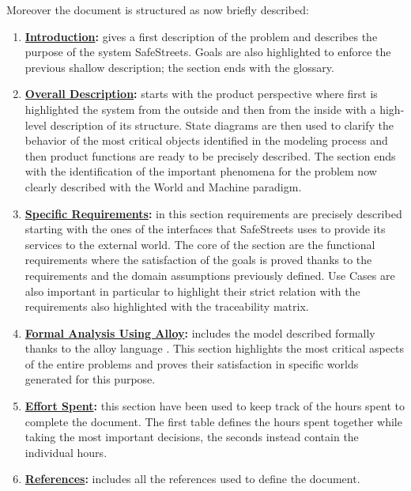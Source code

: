 	Moreover the document is structured as now briefly described:
	\begin{enumerate}
		\item \textbf{\hyperref[sec:introduction]{Introduction}:} gives a first description of the problem and describes the purpose of the system SafeStreets. Goals are also highlighted to enforce the previous shallow description; the section ends with the glossary.
		
		\item \textbf{\hyperref[sec:overallDescription]{Overall Description}:} starts with the product perspective where first is highlighted the system from the outside and then from the inside with a high-level description of its structure. State diagrams are then used to clarify the behavior of the most critical objects identified in the modeling process and then product functions are ready to be precisely described. The section ends with the identification of the important phenomena for the problem now clearly described with the World and Machine paradigm.
		
		\item \textbf{\hyperref[sec:specificRequirements]{Specific Requirements}:} in this section requirements are precisely described starting with the ones of the interfaces that SafeStreets uses to provide its services to the external world. The core of the section are the functional requirements where the satisfaction of the goals is proved thanks to the requirements and the domain assumptions previously defined. Use Cases are also important in particular to highlight their strict relation with the requirements also highlighted with the traceability matrix.
		
		\item \textbf{\hyperref[sec:formalAnalysisUsingAlloy]{Formal Analysis Using Alloy}:} includes the model described formally thanks to the alloy language \cite{Alloy}. This section highlights the most critical aspects of the entire problems and proves their satisfaction in specific worlds generated for this purpose.
		
		\item \textbf{\hyperref[sec:effortSpent]{Effort Spent}:} this section have been used to keep track of the hours spent to complete the document. The first table defines the hours spent together while taking the most important decisions, the seconds instead contain the individual hours.
		
		\item \textbf{\hyperref[sec:references]{References}:} includes all the references used to define the document.
	\end{enumerate}
